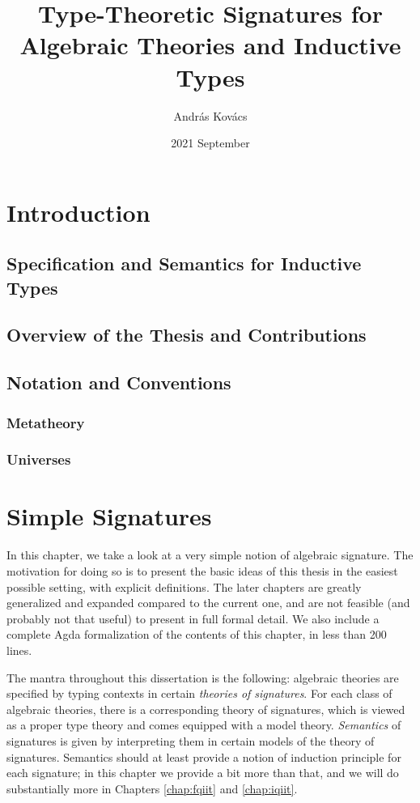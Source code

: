 \documentclass[12pt,a4paper,twoside,openany]{book}
\title{Type-Theoretic Signatures for Algebraic Theories and Inductive Types}
\date{2021 September}
\author{András Kovács}
\theoremstyle{remark}
\theoremstyle{definition}
\theoremstyle{theorem}
\begin{document}
\clearpage\maketitle
\thispagestyle{empty}

\frontmatter
\tableofcontents{}

\mainmatter
\chapter{Introduction}
\section{Specification and Semantics for Inductive Types}
\section{Overview of the Thesis and Contributions}
\section{Notation and Conventions}
\subsection{Metatheory}
\subsection{Universes}
\label{sec:universes}
\label{sec:notation}

\chapter{Simple Signatures}
\label{chap:simple-inductive-signatures}

In this chapter, we take a look at a very simple notion of algebraic
signature. The motivation for doing so is to present the basic ideas of this
thesis in the easiest possible setting, with explicit definitions. The later
chapters are greatly generalized and expanded compared to the current one, and
are not feasible (and probably not that useful) to present in full formal
detail. We also include a complete Agda formalization of the contents of this
chapter, in less than 200 lines.

The mantra throughout this dissertation is the following: algebraic theories are
specified by typing contexts in certain \emph{theories of signatures}. For each
class of algebraic theories, there is a corresponding theory of signatures,
which is viewed as a proper type theory and comes equipped with a model
theory. \emph{Semantics} of signatures is given by interpreting them in certain
models of the theory of signatures. Semantics should at least provide a notion
of induction principle for each signature; in this chapter we provide a bit more
than that, and we will do substantially more in Chapters \ref{chap:fqiit} and
\ref{chap:iqiit}.
\end{document}
